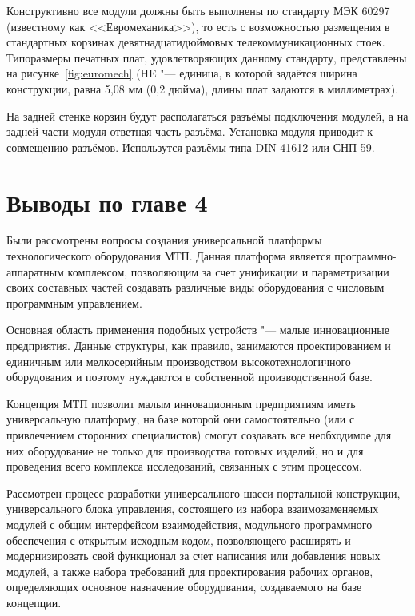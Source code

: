 Конструктивно все модули должны быть выполнены по стандарту МЭК 60297 (известному как <<Евромеханика>>), то есть с возможностью размещения в стандартных корзинах девятнадцатидюймовых телекоммуникационных стоек. Типоразмеры печатных плат, удовлетворяющих данному стандарту, представлены на рисунке~\cref{fig:euromech} (\foreignlanguage{english}{HE} "--- единица, в которой задаётся ширина конструкции, равна 5,08 мм (0,2 дюйма), длины плат задаются в миллиметрах).

На задней стенке корзин будут располагаться разъёмы подключения модулей, а на задней части модуля ответная часть разъёма. Установка модуля приводит к совмещению разъёмов. Использутся разъёмы типа DIN 41612 или СНП-59.


\section{Выводы по главе 4}

Были рассмотрены вопросы создания универсальной платформы технологического оборудования МТП. Данная платформа является программно-аппаратным комплексом, позволяющим за счет унификации и параметризации своих составных частей создавать различные виды оборудования с числовым программным управлением.

Основная область применения подобных устройств "--- малые инновационные предприятия. Данные структуры, как правило, занимаются проектированием и единичным или мелкосерийным производством высокотехнологичного оборудования и поэтому нуждаются в собственной производственной базе.

Концепция МТП позволит малым инновационным предприятиям иметь универсальную платформу, на базе которой они самостоятельно (или с привлечением сторонних специалистов) смогут создавать все необходимое для них оборудование не только для производства готовых изделий, но и для проведения всего комплекса исследований, связанных с этим процессом.

Рассмотрен процесс разработки универсального шасси портальной конструкции, универсального блока управления, состоящего из набора взаимозаменяемых модулей с общим интерфейсом взаимодействия, модульного программного обеспечения с открытым исходным кодом, позволяющего расширять и модернизировать свой функционал за счет написания или добавления новых модулей, а также набора требований для проектирования рабочих органов, определяющих основное назначение оборудования, создаваемого на базе концепции.


\FloatBarrier


\FloatBarrier